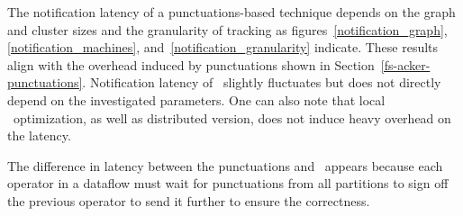 The notification latency of a punctuations-based technique depends on the graph and cluster sizes and the granularity of tracking as figures~\ref{notification_graph},\ref{notification_machines}, and~\ref{notification_granularity} indicate. These results align with the overhead induced by punctuations shown in Section~\ref{fs-acker-punctuations}. Notification latency of \tracker\ slightly fluctuates but does not directly depend on the investigated parameters. One can also note that local \tracker\ optimization, as well as distributed version, does not induce heavy overhead on the latency.

The difference in latency between the punctuations and \tracker\ appears because each operator in a dataflow must wait for punctuations from all partitions to sign off the previous operator to send it further to ensure the correctness. 

